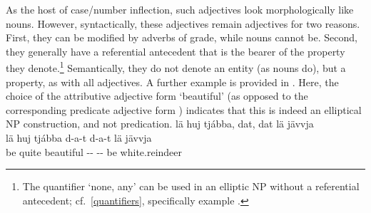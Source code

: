 As the host of case/number inflection, such adjectives look morphologically like nouns. 
However, syntactically, these adjectives remain adjectives for two reasons. First, they can be modified by adverbs of grade, while nouns cannot be. Second, they generally have a referential antecedent that is the bearer of the property they denote.\footnote{The quantifier  ‘none, any’ can be used in an elliptic NP without a referential antecedent; cf.~\SEC\ref{quantifiers}, specifically example .} 
Semantically, they do not denote an entity (as nouns do), but a property, as with all adjectives. 
A further example is provided in . 
Here, the choice of the attributive adjective form  ‘beautiful’ (as opposed to the corresponding predicate adjective form ) indicates that this is indeed an elliptical NP construction, and not predication. 
\ea\label{adjNPheadEx4}
\glll	lä huj tjábba, dat, dat lä jävvja\\
	lä huj tjábba d-a-t d-a-t lä jävvja\\
	be\BS{} quite beautiful\BS{} -- -- be\BS{} white.reindeer\BS{}\\\nopagebreak
{}	
\z
{}



